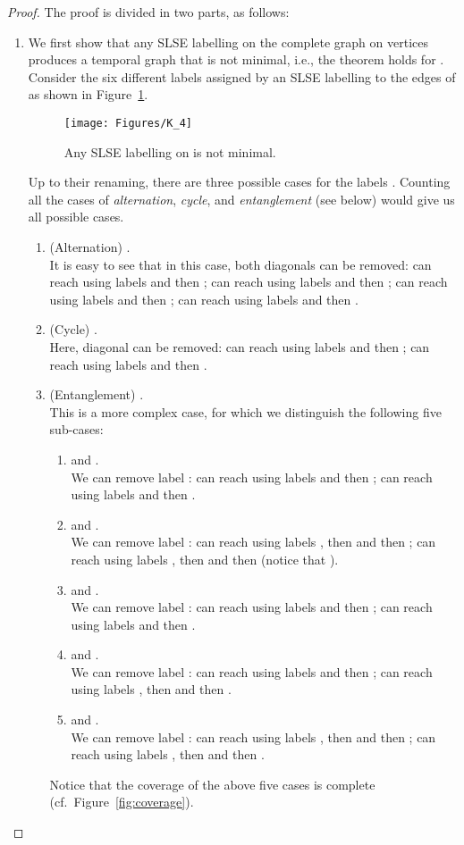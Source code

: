 \documentclass[a4paper,UKenglish]{article}
\begin{document}
\begin{proof}
The proof is divided in two parts, as follows:
\begin{enumerate}[label=(\alph*)]

\item\label{item:code_a} We first show that any SLSE labelling on the complete graph on  vertices produces a temporal graph that is not minimal, i.e., the theorem holds for . Consider the six different labels  assigned by an SLSE labelling to the edges of  as shown in Figure~\ref{fig:K_4}.

\begin{figure}[tbh!]
\centering
\texttt{[image: Figures/K\_4]}
\caption{Any SLSE labelling on  is not minimal.}
\label{fig:K_4}
\end{figure}

Up to their renaming, there are three possible cases for the labels . Counting all the cases of \emph{alternation}, \emph{cycle}, and \emph{entanglement} (see below) would give us all possible  cases.

\begin{enumerate}[label=\arabic*.]
\item (Alternation) .\\It is easy to see that in this case, both diagonals can be removed:  can reach  using labels  and then ;  can reach  using labels  and then ;  can reach  using labels  and then ;  can reach  using labels  and then .
\item (Cycle) .\\Here, diagonal  can be removed:  can reach  using labels  and then ;  can reach  using labels  and then .
\item (Entanglement) .\\This is a more complex case, for which we distinguish the following five sub-cases:
	\begin{enumerate}[label=\roman*)]
	\item  and .\\We can remove label :  can reach  using labels  and then ;  can reach  using labels  and then .
	\item  and .\\We can remove label :  can reach  using labels , then  and then ;  can reach  using labels , then  and then  (notice that ).
	\item  and .\\We can remove label :  can reach  using labels  and then ;  can reach  using labels  and then .
	\item  and .\\We can remove label :  can reach  using labels  and then ;  can reach  using labels , then  and then .
	\item  and .\\We can remove label :  can reach  using labels , then  and then ;  can reach  using labels , then  and then .
	\end{enumerate}
	Notice that the coverage of the above five cases is complete (cf.~Figure~\ref{fig:coverage}).
	\begin{figure}[tbh!]
	\centering


\end{figure}
\end{enumerate}
\end{enumerate}
\end{proof}
\end{document}
